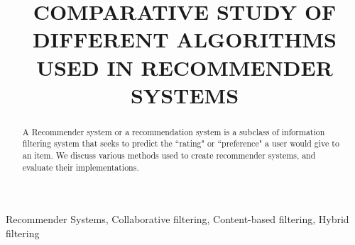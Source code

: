 \documentclass[conference]{IEEEtran}
\begin{document}
\title{COMPARATIVE STUDY OF
DIFFERENT ALGORITHMS USED
IN RECOMMENDER SYSTEMS}

\author{
\and
{}
}

\maketitle

\begin{abstract}
A Recommender system or a recommendation system is a subclass of information filtering system that seeks to predict the ``rating" or ``preference" a user would give to an item.
We discuss various methods used to create recommender systems, and evaluate their implementations.
\end{abstract}

\begin{IEEEkeywords}
Recommender Systems, Collaborative filtering, Content-based filtering, Hybrid filtering
\end{IEEEkeywords}
\end{document}
